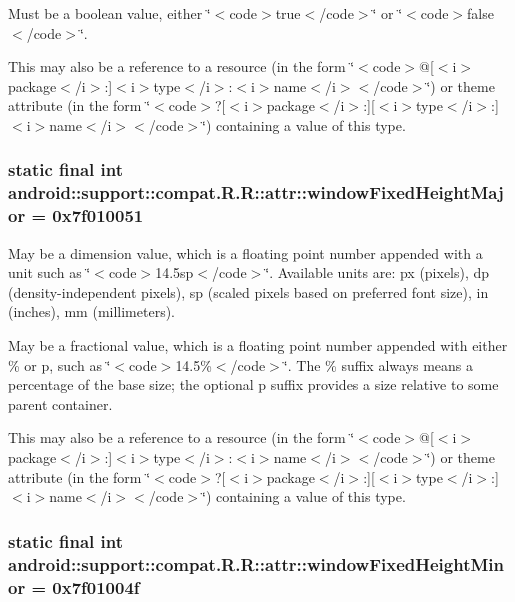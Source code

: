 Must be a boolean value, either \char`\"{}$<$code$>$true$<$/code$>$\char`\"{} or \char`\"{}$<$code$>$false$<$/code$>$\char`\"{}. 

This may also be a reference to a resource (in the form \char`\"{}$<$code$>$@\mbox{[}$<$i$>$package$<$/i$>$:\mbox{]}$<$i$>$type$<$/i$>$:$<$i$>$name$<$/i$>$$<$/code$>$\char`\"{}) or theme attribute (in the form \char`\"{}$<$code$>$?\mbox{[}$<$i$>$package$<$/i$>$:\mbox{]}\mbox{[}$<$i$>$type$<$/i$>$:\mbox{]}$<$i$>$name$<$/i$>$$<$/code$>$\char`\"{}) containing a value of this type. \hypertarget{classandroid_1_1support_1_1compat_1_1_r_1_1attr_dddeb276735743ac301369d89f03fbe0}{
\subsubsection[{windowFixedHeightMajor}]{\setlength{\rightskip}{0pt plus 5cm}static final int android::support::compat.R.R::attr::windowFixedHeightMajor = 0x7f010051}}
\label{classandroid_1_1support_1_1compat_1_1_r_1_1attr_dddeb276735743ac301369d89f03fbe0}


May be a dimension value, which is a floating point number appended with a unit such as \char`\"{}$<$code$>$14.5sp$<$/code$>$\char`\"{}. Available units are: px (pixels), dp (density-independent pixels), sp (scaled pixels based on preferred font size), in (inches), mm (millimeters). 

May be a fractional value, which is a floating point number appended with either \% or p, such as \char`\"{}$<$code$>$14.5\%$<$/code$>$\char`\"{}. The \% suffix always means a percentage of the base size; the optional p suffix provides a size relative to some parent container. 

This may also be a reference to a resource (in the form \char`\"{}$<$code$>$@\mbox{[}$<$i$>$package$<$/i$>$:\mbox{]}$<$i$>$type$<$/i$>$:$<$i$>$name$<$/i$>$$<$/code$>$\char`\"{}) or theme attribute (in the form \char`\"{}$<$code$>$?\mbox{[}$<$i$>$package$<$/i$>$:\mbox{]}\mbox{[}$<$i$>$type$<$/i$>$:\mbox{]}$<$i$>$name$<$/i$>$$<$/code$>$\char`\"{}) containing a value of this type. \hypertarget{classandroid_1_1support_1_1compat_1_1_r_1_1attr_81ad93c2efdd833bbb340cd7920817cd}{
\subsubsection[{windowFixedHeightMinor}]{\setlength{\rightskip}{0pt plus 5cm}static final int android::support::compat.R.R::attr::windowFixedHeightMinor = 0x7f01004f}}
\label{classandroid_1_1support_1_1compat_1_1_r_1_1attr_81ad93c2efdd833bbb340cd7920817cd}


